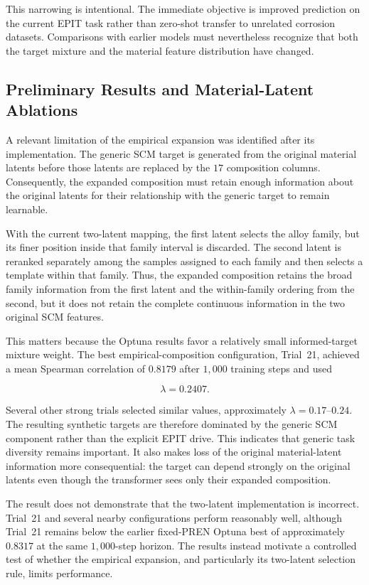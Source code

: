 \documentclass{article}
\begin{document}
This narrowing is intentional. The immediate objective is improved prediction
on the current EPIT task rather than zero-shot transfer to unrelated corrosion
datasets. Comparisons with earlier models must nevertheless recognize that both
the target mixture and the material feature distribution have changed.

\subsection{Preliminary Results and Material-Latent Ablations}
\label{sec:empirical-composition-preliminary-results}

A relevant limitation of the empirical expansion was identified after its
implementation. The generic SCM target is generated from the original material
latents before those latents are replaced by the \(17\) composition columns.
Consequently, the expanded composition must retain enough information about the
original latents for their relationship with the generic target to remain
learnable.

With the current two-latent mapping, the first latent selects the alloy family,
but its finer position inside that family interval is discarded. The second
latent is reranked separately among the samples assigned to each family and then
selects a template within that family. Thus, the expanded composition retains
the broad family information from the first latent and the within-family ordering
from the second, but it does not retain the complete continuous information in
the two original SCM features.

This matters because the Optuna results favor a relatively small informed-target
mixture weight. The best empirical-composition configuration, Trial~21, achieved
a mean Spearman correlation of \(0.8179\) after \(1{,}000\) training steps and
used

\[
\lambda = 0.2407.
\]

Several other strong trials selected similar values, approximately
\(\lambda=0.17\)--\(0.24\). The resulting synthetic targets are therefore
dominated by the generic SCM component rather than the explicit EPIT drive.
This indicates that generic task diversity remains important. It also makes
loss of the original material-latent information more consequential: the target
can depend strongly on the original latents even though the transformer sees
only their expanded composition.

The result does not demonstrate that the two-latent implementation is incorrect.
Trial~21 and several nearby configurations perform reasonably well, although
Trial~21 remains below the earlier fixed-PREN Optuna best of approximately
\(0.8317\) at the same \(1{,}000\)-step horizon. The results instead motivate a
controlled test of whether the empirical expansion, and particularly its
two-latent selection rule, limits performance.
\end{document}
